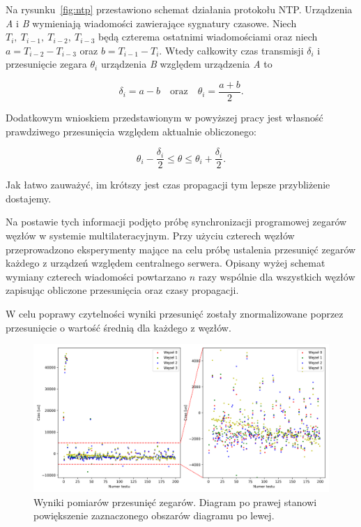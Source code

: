 Na rysunku~\ref{fig:ntp} przestawiono schemat działania protokołu NTP. Urządzenia \textit{A} i \textit{B} wymieniają wiadomości zawierające sygnatury czasowe. Niech $T_{i},\ T_{i-1},\ T_{i-2},\ T_{i-3}$ będą czterema ostatnimi wiadomościami oraz niech $a = T_{i-2} - T_{i-3}$ oraz $b = T_{i-1} - T_i$. Wtedy całkowity czas transmisji $\delta_i$ i przesunięcie zegara $\theta_i$ urządzenia \textit{B} względem urządzenia \textit{A} to

\[\delta_i = a - b\quad \text{oraz}\quad \theta_i = \frac{a+b}{2}.\]

Dodatkowym wnioskiem przedstawionym w powyższej pracy jest własność prawdziwego przesunięcia względem aktualnie obliczonego:

\[\theta_i - \frac{\delta_i}{2} \leqslant \theta \leqslant \theta_i + \frac{\delta_i}{2}.\]

Jak łatwo zauważyć, im krótszy jest czas propagacji tym lepsze przybliżenie dostajemy.

Na postawie tych informacji podjęto próbę synchronizacji programowej zegarów węzłów w systemie multilateracyjnym. Przy użyciu czterech węzłów przeprowadzono eksperymenty mające na celu próbę ustalenia przesunięć zegarów każdego z urządzeń względem centralnego serwera. Opisany wyżej schemat wymiany czterech wiadomości powtarzano $n$ razy wspólnie dla wszystkich węzłów zapisując obliczone przesunięcia oraz czasy propagacji.

W celu poprawy czytelności wyniki przesunięć zostały znormalizowane poprzez przesunięcie o wartość średnią dla każdego z węzłów.

\begin{figure}[H]
    \centering
    \includegraphics[width=\textwidth]{pics/ntp_sync/offsets.png}
    \caption{Wyniki pomiarów przesunięć zegarów.  Diagram po prawej stanowi powiększenie zaznaczonego obszarów diagramu po lewej.}
    \label{pic:offsets_ntp}
\end{figure}

